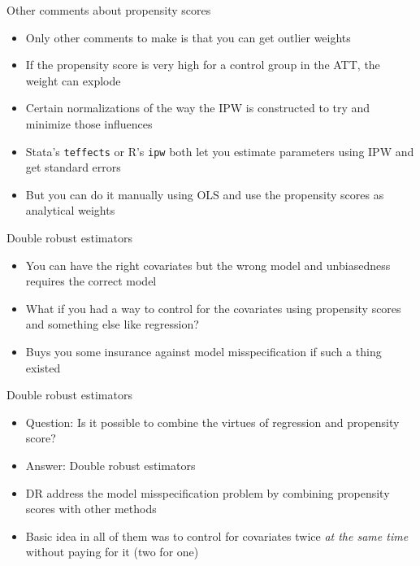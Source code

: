 \documentclass{beamer}
\begin{document}
\begin{frame}{Other comments about propensity scores}

\begin{itemize}

\item Only other comments to make is that you can get outlier weights
\item If the propensity score is very high for a control group in the ATT, the weight can explode
\item Certain normalizations of the way the IPW is constructed to try and minimize those influences
\item Stata's \texttt{teffects} or R's \texttt{ipw} both let you estimate parameters using IPW and get standard errors
\item But you can do it manually using OLS and use  the propensity scores as analytical weights

\end{itemize}

\end{frame}


\begin{frame}{Double robust estimators}

\begin{itemize}
\item You can have the right covariates but the wrong model and unbiasedness requires the correct model
\item What if you had a way to control for the covariates using propensity scores and something else like regression?
\item Buys you some insurance against model misspecification if such a thing existed
\end{itemize}

\end{frame}

\begin{frame}{Double robust estimators}

\begin{itemize}
\item Question: Is it possible to combine the virtues of regression and propensity score?
\item Answer: Double robust estimators
\item DR address the model misspecification problem by combining propensity scores with other methods 
\item Basic idea in all of them was to control for covariates twice \emph{at the same time} without paying for it (two for one)
\end{itemize}

\end{frame}
\end{document}

